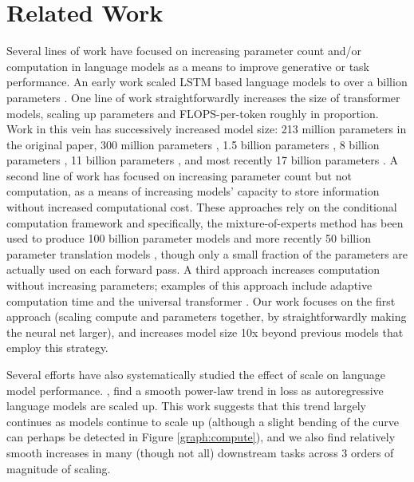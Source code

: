\section{Related Work}
\label{section:Related Work}

Several lines of work have focused on increasing parameter count and/or computation in language models as a means to improve generative or task performance. An early work scaled LSTM based language models to over a billion parameters \cite{jozefowicz2016exploring}. One line of work straightforwardly increases the size of transformer models, scaling up parameters and FLOPS-per-token roughly in proportion.  Work in this vein has successively increased model size: 213 million parameters \cite{vaswani2017attention} in the original paper, 300 million parameters \cite{devlin2018bert}, 1.5 billion parameters \cite{radford2019language}, 8 billion parameters  \cite{shoeybi2019megatronlm}, 11 billion parameters \cite{raffel2019t5}, and most recently 17 billion parameters \cite{turing_17m}.  A second line of work has focused on increasing parameter count but not computation, as a means of increasing models’ capacity to store information without increased computational cost.  These approaches rely on the conditional computation framework \cite{bengio2013cond} and specifically, the mixture-of-experts method \cite{shazeer2017outrageously} has been used to produce 100 billion parameter models and more recently 50 billion parameter translation models \cite{aharoni201950B}, though only a small fraction of the parameters are actually used on each forward pass. A third approach increases computation without increasing parameters; examples of this approach include adaptive computation time \cite{graves2016act} and  the universal transformer \cite{dehghani2018ut}. Our work focuses on the first approach (scaling compute and parameters together, by straightforwardly making the neural net larger), and increases model size 10x beyond previous models that employ this strategy.

Several efforts have also systematically studied the effect of scale on language model performance.  \cite{kaplan2020scaling,rosenfeld2019constructive,li2020train,hestness2017deep}, find a smooth power-law trend in loss as autoregressive language models are scaled up.  This work suggests that this trend largely continues as models continue to scale up (although a slight bending of the curve can perhaps be detected in Figure \ref{graph:compute}), and we also find relatively smooth increases in many (though not all) downstream tasks across 3 orders of magnitude of scaling.

